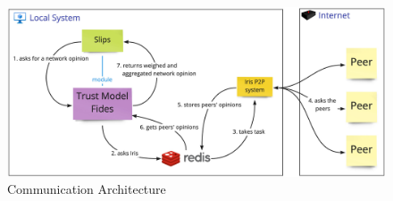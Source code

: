 \begin{figure}[h]
    \centering
    \includegraphics[width=1.0\textwidth]{assets/communication_architecture.jpeg}
    \caption{Communication Architecture}
    \label{fig:high-level-communication-architecture}
\end{figure}



